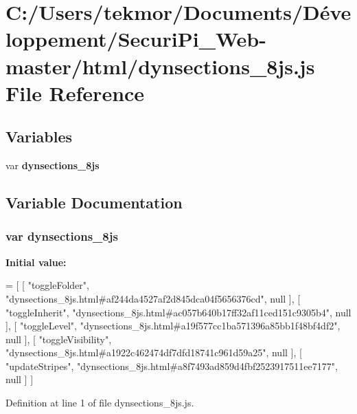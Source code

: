 \section{C\+:/\+Users/tekmor/\+Documents/\+Développement/\+Securi\+Pi\+\_\+\+Web-\/master/html/dynsections\+\_\+8js.js File Reference}
\label{dynsections__8js_8js}
\subsection*{Variables}
\begin{DoxyCompactItemize}
\item 
var {\bf dynsections\+\_\+8js}
\end{DoxyCompactItemize}


\subsection{Variable Documentation}
\subsubsection[{dynsections\+\_\+8js}]{\setlength{\rightskip}{0pt plus 5cm}var dynsections\+\_\+8js}\label{dynsections__8js_8js_a364858300683fff0e99e7151c9d63065}
{\bfseries Initial value\+:}
\begin{DoxyCode}
=
[
    [ \textcolor{stringliteral}{"toggleFolder"}, \textcolor{stringliteral}{"dynsections\_8js.html#af244da4527af2d845dca04f5656376cd"}, null ],
    [ \textcolor{stringliteral}{"toggleInherit"}, \textcolor{stringliteral}{"dynsections\_8js.html#ac057b640b17ff32af11ced151c9305b4"}, null ],
    [ \textcolor{stringliteral}{"toggleLevel"}, \textcolor{stringliteral}{"dynsections\_8js.html#a19f577cc1ba571396a85bb1f48bf4df2"}, null ],
    [ \textcolor{stringliteral}{"toggleVisibility"}, \textcolor{stringliteral}{"dynsections\_8js.html#a1922c462474df7dfd18741c961d59a25"}, null ],
    [ \textcolor{stringliteral}{"updateStripes"}, \textcolor{stringliteral}{"dynsections\_8js.html#a8f7493ad859d4fbf2523917511ee7177"}, null ]
]
\end{DoxyCode}


Definition at line 1 of file dynsections\+\_\+8js.\+js.


